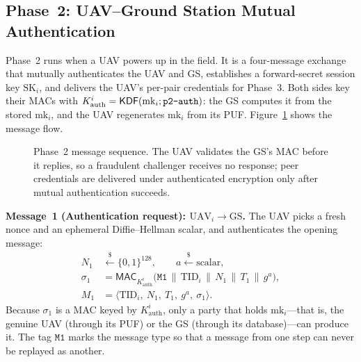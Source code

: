 \documentclass[11pt,a4paper]{article}
\begin{document}
\subsection{Phase~2: UAV--Ground Station Mutual Authentication}
\label{subsec:phase2}

Phase~2 runs when a UAV powers up in the field. It is a four-message exchange
that mutually authenticates the UAV and GS, establishes a forward-secret
session key $\text{SK}_i$, and delivers the UAV's per-pair credentials for
Phase~3. Both sides key their MACs with
$K^{i}_{\text{auth}}=\mathsf{KDF}(\text{mk}_i;\texttt{p2\text{-}auth})$: the GS
computes it from the stored $\text{mk}_i$, and the UAV regenerates
$\text{mk}_i$ from its PUF. Figure~\ref{fig:phase2} shows the message flow.

\begin{figure}[H]
\centering
{}
\caption{Phase~2 message sequence. The UAV validates the GS's MAC before it
replies, so a fraudulent challenger receives no response; peer credentials are
delivered under authenticated encryption only after mutual authentication
succeeds.}
\label{fig:phase2}
\end{figure}

\textbf{Message~1 (Authentication request): $\text{UAV}_i \rightarrow \text{GS}$.}
The UAV picks a fresh nonce and an ephemeral Diffie--Hellman scalar, and
authenticates the opening message:
\begin{align}
N_1 &\xleftarrow{\$} \{0,1\}^{128}, \qquad a \xleftarrow{\$} \text{scalar}, \\[1ex]
\sigma_1 &= \mathsf{MAC}_{K^{i}_{\text{auth}}}\big(\texttt{M1}\,\|\,\text{TID}_i\,\|\,N_1\,\|\,T_1\,\|\,g^{a}\big), \\[1ex]
M_1 &= \langle \text{TID}_i,\ N_1,\ T_1,\ g^{a},\ \sigma_1 \rangle.
\end{align}
Because $\sigma_1$ is a MAC keyed by $K^{i}_{\text{auth}}$, only a party that
holds $\text{mk}_i$---that is, the genuine UAV (through its PUF) or the GS
(through its database)---can produce it. The tag $\texttt{M1}$ marks the
message type so that a message from one step can never be replayed as another.
\end{document}
